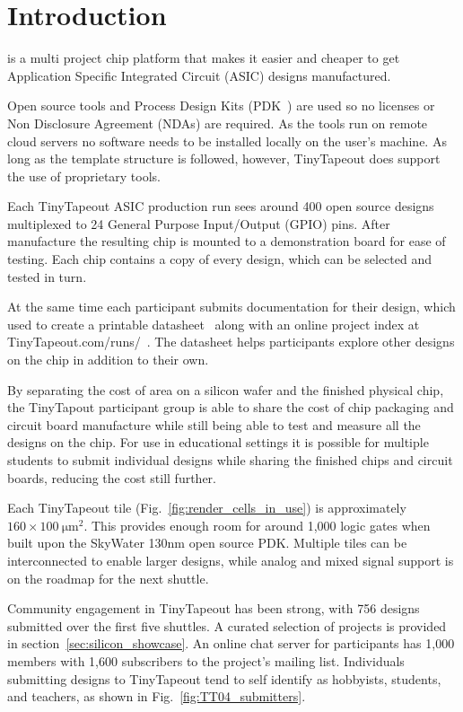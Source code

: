 \section{Introduction}
\label{sec:introduction}
 is a multi project chip platform that makes it easier and cheaper to get Application Specific Integrated Circuit (ASIC) designs manufactured.

Open source tools and Process Design Kits (PDK~\cite{pdk}) are used so no licenses or Non Disclosure Agreement (NDAs) are required. As the tools run on remote cloud servers no software needs to be installed locally on the user's machine. As long as the template structure is followed, however, TinyTapeout does support the use of proprietary tools.

Each TinyTapeout ASIC production run sees around 400 open source designs multiplexed to 24 General Purpose Input/Output (GPIO) pins. After manufacture the resulting chip is mounted to a demonstration board for ease of testing. Each chip contains a copy of every design, which can be selected and tested in turn.

At the same time each participant submits documentation for their design, which used to create a printable datasheet~\cite{datasheet} along with an online project index at TinyTapeout.com/runs/~\cite{tinytapeoutruns}. The datasheet helps participants explore other designs on the chip in addition to their own.

By separating the cost of area on a silicon wafer and the finished physical chip, the TinyTapout participant group is able to share the cost of chip packaging and circuit board manufacture while still being able to test and measure all the designs on the chip. For use in educational settings it is possible for multiple students to submit individual designs while sharing the finished chips and circuit boards, reducing the cost still further.

Each TinyTapeout tile (Fig.~\ref{fig:render_cells_in_use}) is approximately $160 \times \qty{100}{\micro\meter\squared}$. This provides enough room for around 1,000 logic gates when built upon the SkyWater 130nm open source PDK. Multiple tiles can be interconnected to enable larger designs, while analog and mixed signal support is on the roadmap for the next shuttle.

Community engagement in TinyTapeout has been strong, with 756 designs submitted over the first five shuttles. A curated selection of projects is provided in section~\ref{sec:silicon_showcase}.
An online chat server for participants has 1,000 members with 1,600 subscribers to the project's mailing list. Individuals submitting designs to TinyTapeout tend to self identify as hobbyists, students, and teachers, as shown in Fig.~\ref{fig:TT04_submitters}.

